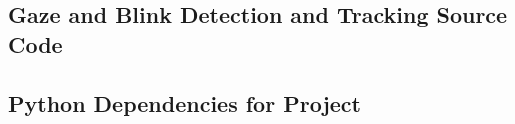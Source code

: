 \documentclass[9pt,conference]{IEEEtran}
\begin{document}
\subsection{Gaze and Blink Detection and Tracking Source Code}
\label{a2}


\subsection{Python Dependencies for Project}
\label{a3}

\end{document}
